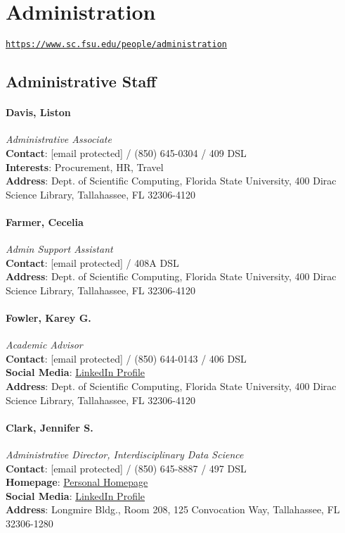 \documentclass[12pt,a4paper]{article}
\begin{document}
\section{Administration}
\texttt{\url{https://www.sc.fsu.edu/people/administration}}

\subsection{Administrative Staff}

\paragraph{Davis, Liston}
\textit{Administrative Associate}\\
\textbf{Contact}: [email protected] / (850) 645-0304 / 409 DSL\\
\textbf{Interests}: Procurement, HR, Travel\\
\textbf{Address}: Dept. of Scientific Computing, Florida State University, 400 Dirac Science Library, Tallahassee, FL 32306-4120

\paragraph{Farmer, Cecelia}
\textit{Admin Support Assistant}\\
\textbf{Contact}: [email protected] / 408A DSL\\
\textbf{Address}: Dept. of Scientific Computing, Florida State University, 400 Dirac Science Library, Tallahassee, FL 32306-4120

\paragraph{Fowler, Karey G.}
\textit{Academic Advisor}\\
\textbf{Contact}: [email protected] / (850) 644-0143 / 406 DSL\\
\textbf{Social Media}: \href{https://www.linkedin.com/in/karey-fowler-90a18430}{LinkedIn Profile}\\
\textbf{Address}: Dept. of Scientific Computing, Florida State University, 400 Dirac Science Library, Tallahassee, FL 32306-4120

\paragraph{Clark, Jennifer S.}
\textit{Administrative Director, Interdisciplinary Data Science}\\
\textbf{Contact}: [email protected] / (850) 645-8887 / 497 DSL\\
\textbf{Homepage}: \href{https://datascience.fsu.edu/}{Personal Homepage}\\
\textbf{Social Media}: \href{https://www.linkedin.com/in/jennifer-s-clark-ids/}{LinkedIn Profile}\\
\textbf{Address}: Longmire Bldg., Room 208, 125 Convocation Way, Tallahassee, FL 32306-1280
\end{document}
